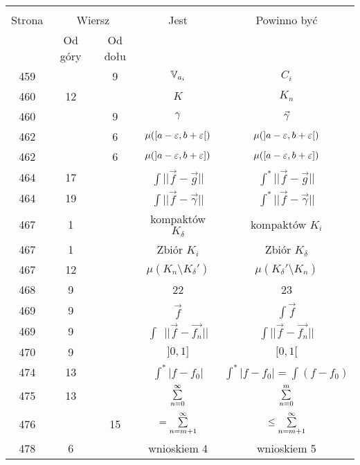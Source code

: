 \documentclass[a4paper,11pt]{article}
\newcommand{\V}{\mb{V}}
\begin{document}
\begin{center}
  \begin{tabular}{|c|c|c|c|c|}
    \hline
    & \multicolumn{2}{c|}{} & & \\
    Strona & \multicolumn{2}{c|}{Wiersz} & Jest
                              & Powinno być \\ \cline{2-3}
    & Od góry & Od dołu & & \\
    \hline
    459 & &  9 & $\V_{ a_{ i } }$ & $C_{ i }$ \\
    460 & 12 & & $K$ & $K_{ n }$ \\
    460 & &  9 & $\gamma$ & $\vec{ \gamma }$ \\
    462 & &  6 & $\mu( [ a - \varepsilon, b + \varepsilon [ )$
           & $\mu( ] a - \varepsilon, b + \varepsilon [ )$ \\
    462 & &  6 & $\mu( ] a - \varepsilon, b + \varepsilon ] )$
           & $\mu( [ a - \varepsilon, b + \varepsilon ] )$ \\
    464 & 17 & & $\int || \vec{ f } - \vec{ g } ||$
           & $\int^{ * } || \vec{ f } - \vec{ g } ||$ \\
    464 & 19 & & $\int || \vec{ f } - \vec{ \gamma } ||$
           & $\int^{ * } || \vec{ f } - \vec{ \gamma } ||$ \\
    467 &  1 & & kompaktów $K_{ \delta }$ & kompaktów $K_{ i }$ \\
    467 &  1 & & Zbiór $K_{ i }$ & Zbiór $K_{ \delta }$ \\
    467 & 12 & & $\mu( K_{ n } \setminus K_{ \delta }' )$
           & $\mu( K_{ \delta }' \setminus K_{ n } )$ \\
    468 &  9 & & 22 & 23 \\
    469 &  9 & & $\vec{ f }$ & $\int \vec{ f }$ \\
    469 &  9 & & $\int\:\; || \vec{ f } - \vec{ f_{ n } } ||$
           & $\int || \vec{ f } - \vec{ f_{ n } } ||$ \\
    470 &  9 & & $] 0, 1 ]$ & $[ 0, 1 [$ \\
    474 & 13 & & $\int^{ * } | f - f_{ 0 } |$
           & $\int^{ * } | f - f_{ 0 } | = \int ( f - f_{ 0 } )$ \\
    475 & 13 & &  $\sum\limits_{ n = 0 }^{ \infty }$ & $\sum\limits_{ n = 0 }^{ m }$ \\
    476 & & 15 & $= \sum\limits^{ \infty }_{ n = m + 1 }$
           & $\leq \sum\limits^{ \infty }_{ n = m + 1 }$ \\
    478 &  6 & & wnioskiem 4 & wnioskiem 5 \\

\end{tabular}
\end{center}
\end{document}
